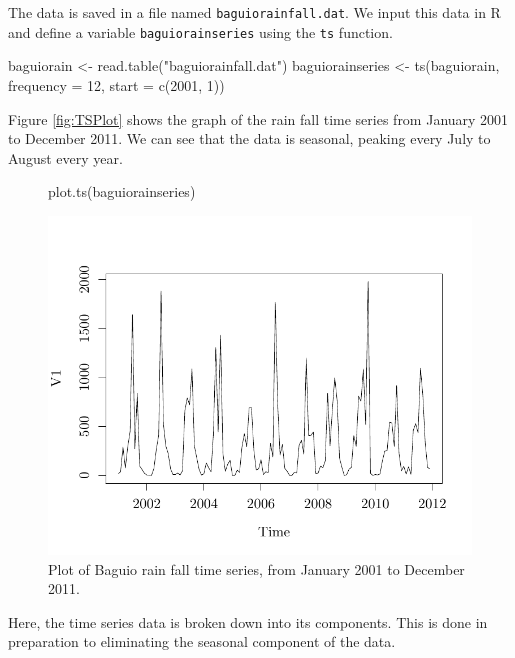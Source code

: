 \documentclass{article}\usepackage{graphicx, color}
\newcommand{\Rstat}{\textsf{R}}
\begin{document}
The data is saved in a file named \texttt{baguiorainfall.dat}. We input this data in \Rstat{} and define a variable \texttt{baguiorainseries} using the \texttt{ts} function.

\begin{Schunk}
\begin{Sinput}
baguiorain <- read.table("baguiorainfall.dat")
baguiorainseries <- ts(baguiorain, frequency = 12, start = c(2001, 1))
\end{Sinput}
\end{Schunk}


Figure \eqref{fig:TSPlot} shows the graph of the rain fall time series from January 2001 to December 2011. We can see that the data is seasonal, peaking every July to August every year.

\begin{figure}[!ht]
\centering
\begin{Schunk}
\begin{Sinput}
plot.ts(baguiorainseries)
\end{Sinput}

\includegraphics[width=.7\textwidth]{figure/listings-YeastBoxPlot} \end{Schunk}


\caption{\label{fig:TSPlot} Plot of Baguio rain fall time series, from January 2001 to December 2011.}
\end{figure}

Here, the time series data is broken down into its components. This is done in preparation to eliminating the seasonal component of the data.
\end{document}
